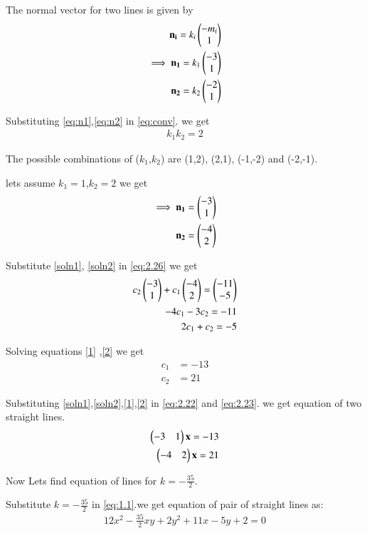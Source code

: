 \documentclass[journal,12pt,twocolumn]{IEEEtran}
\begin{document}
The normal vector for two lines is given by
\begin{align}
    \mathbf{n_i}=k_i\begin{pmatrix}-m_i\\1\end{pmatrix}\label{eq:normvec}\\
    \implies\mathbf{n_1}=k_1\begin{pmatrix}-3\\1\end{pmatrix}\label{eq:n1}\\
    \mathbf{n_2}=k_2\begin{pmatrix}-2\\1\end{pmatrix}\label{eq:n2}
\end{align}

Substituting \eqref{eq:n1},\eqref{eq:n2} in \eqref{eq:conv}. we get
\begin{align}
    k_1k_2=2
\end{align}

The possible combinations of ($k_1$,$k_2$) are (1,2), (2,1), (-1,-2) and (-2,-1).

lets assume $k_1=1$,$k_2=2$ we get
\begin{align}
    \implies\mathbf{n_1}=\begin{pmatrix}-3\\1\end{pmatrix}\label{soln1}\\
    \mathbf{n_2}=\begin{pmatrix}-4\\2\end{pmatrix}\label{soln2}
\end{align}

Substitute \eqref{soln1}, \eqref{soln2} in \eqref{eq:2.26} we get 
\begin{align}
    c_2\begin{pmatrix}-3\\1\end{pmatrix}+c_1\begin{pmatrix}-4\\2\end{pmatrix}=\begin{pmatrix} -11\\ -5\end{pmatrix}\\
    -4c_1-3c_2=-11\label{1}\\
    2c_1+c_2=-5\label{2}
\end{align}

Solving equations \eqref{1} ,\eqref{2} we get 
\begin{align}
    c_1&=-13\\
    c_2&=21
\end{align}

Substituting \eqref{soln1},\eqref{soln2},\eqref{1},\eqref{2} in \eqref{eq:2.22} and \eqref{eq:2.23}. we get equation of two straight lines.
\begin{align}
    \begin{pmatrix}-3 & 1\end{pmatrix}\mathbf{x}=-13\\
    \begin{pmatrix}-4 & 2\end{pmatrix}\mathbf{x}=21
\end{align}

Now Lets find equation of lines for $k=-\frac{35}{2}$.

Substitute $k=-\frac{35}{2}$ in \eqref{eq:1.1}.we get equation of pair of straight lines as:
\begin{align}
    12x^2-\frac{35}{2}xy+2y^2+11x-5y+2=0
\end{align}
\end{document}
